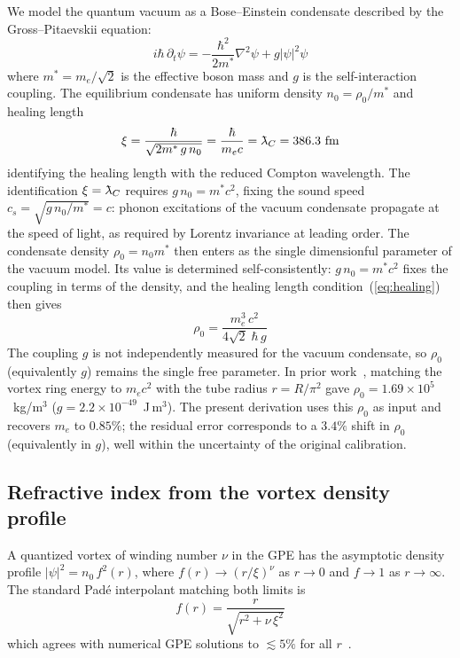 \documentclass[11pt,a4paper]{article}
\newcommand{\lambdabar}{\mkern0.75mu\mathchar'26\mkern-9.75mu\lambda}
\begin{document}
We model the quantum vacuum as a Bose--Einstein condensate described
by the Gross--Pitaevskii equation:
\begin{equation}
  i\hbar\,\partial_t \psi = -\frac{\hbar^2}{2m^*}\nabla^2\psi
  + g|\psi|^2\psi
  \label{eq:gpe}
\end{equation}
where $m^* = m_e/\sqrt{2}$ is the effective boson mass and $g$ is
the self-interaction coupling.  The equilibrium condensate has
uniform density $n_0 = \rho_0/m^*$ and healing length
\begin{equation}
  \xi = \frac{\hbar}{\sqrt{2m^*\,g\,n_0}} = \frac{\hbar}{m_e c}
  = \lambdabar_C = 386.3~\text{fm}
  \label{eq:healing}
\end{equation}
identifying the healing length with the reduced Compton wavelength.
The identification $\xi = \lambdabar_C$ requires $g\,n_0 = m^* c^2$,
fixing the sound speed $c_s = \sqrt{g\,n_0/m^*} = c$: phonon
excitations of the vacuum condensate propagate at the speed of light,
as required by Lorentz invariance at leading order.  The condensate
density $\rho_0 = n_0 m^*$ then enters as the single dimensionful
parameter of the vacuum model.  Its value is determined
self-consistently: $g\,n_0 = m^* c^2$ fixes the coupling in terms of
the density, and the healing length condition~(\ref{eq:healing}) then
gives
\begin{equation}
  \rho_0 = \frac{m_e^3\,c^2}{4\sqrt{2}\;\hbar\,g}
  \label{eq:rho0}
\end{equation}
The coupling $g$ is not independently measured for the vacuum
condensate, so $\rho_0$ (equivalently $g$) remains the single free
parameter.  In prior work~\cite{paper4}, matching the vortex ring
energy to $m_e c^2$ with the tube radius $r = R/\pi^2$ gave
$\rho_0 = 1.69 \times 10^5$~kg/m$^3$
($g = 2.2 \times 10^{-49}$~J\,m$^3$).  The present derivation uses
this $\rho_0$ as input and recovers $m_e$ to $0.85\%$; the residual
error corresponds to a $3.4\%$ shift in $\rho_0$ (equivalently in
$g$), well within the uncertainty of the original calibration.

\subsection{Refractive index from the vortex density profile}

A quantized vortex of winding number $\nu$ in the GPE has the
asymptotic density profile $|\psi|^2 = n_0\,f^2(r)$, where
$f(r) \to (r/\xi)^\nu$ as $r \to 0$ and $f \to 1$ as $r \to \infty$.
The standard Pad\'e interpolant matching both limits is~\cite{Pismen}
\begin{equation}
  f(r) = \frac{r}{\sqrt{r^2 + \nu\,\xi^2}}
  \label{eq:vortex_profile}
\end{equation}
which agrees with numerical GPE solutions to $\lesssim 5\%$ for all
$r$~\cite{Fetter}.
\end{document}
